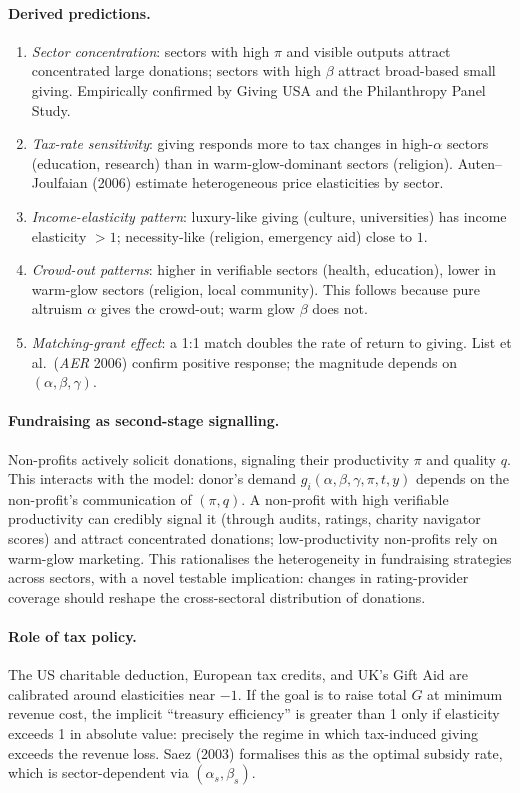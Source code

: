 \documentclass[11pt,a4paper]{article}
\begin{document}
\paragraph{Derived predictions.}
\begin{enumerate}[leftmargin=*,itemsep=1pt]
    \item \emph{Sector concentration}: sectors with high $\pi$ and visible outputs attract concentrated large donations; sectors with high $\beta$ attract broad-based small giving. Empirically confirmed by Giving USA and the Philanthropy Panel Study.
    \item \emph{Tax-rate sensitivity}: giving responds more to tax changes in high-$\alpha$ sectors (education, research) than in warm-glow-dominant sectors (religion). Auten--Joulfaian (2006) estimate heterogeneous price elasticities by sector.
    \item \emph{Income-elasticity pattern}: luxury-like giving (culture, universities) has income elasticity $>1$; necessity-like (religion, emergency aid) close to $1$.
    \item \emph{Crowd-out patterns}: higher in verifiable sectors (health, education), lower in warm-glow sectors (religion, local community). This follows because pure altruism $\alpha$ gives the crowd-out; warm glow $\beta$ does not.
    \item \emph{Matching-grant effect}: a 1:1 match doubles the rate of return to giving. List et al.\ (\emph{AER} 2006) confirm positive response; the magnitude depends on $(\alpha,\beta,\gamma)$.
\end{enumerate}

\paragraph{Fundraising as second-stage signalling.}
Non-profits actively solicit donations, signaling their productivity $\pi$ and quality $q$. This interacts with the model: donor's demand $g_{i}(\alpha,\beta,\gamma,\pi,t,y)$ depends on the non-profit's communication of $(\pi,q)$. A non-profit with high verifiable productivity can credibly signal it (through audits, ratings, charity navigator scores) and attract concentrated donations; low-productivity non-profits rely on warm-glow marketing. This rationalises the heterogeneity in fundraising strategies across sectors, with a novel testable implication: changes in rating-provider coverage should reshape the cross-sectoral distribution of donations.

\paragraph{Role of tax policy.}
The US charitable deduction, European tax credits, and UK's Gift Aid are calibrated around elasticities near $-1$. If the goal is to raise total $G$ at minimum revenue cost, the implicit ``treasury efficiency'' is greater than 1 only if elasticity exceeds 1 in absolute value: precisely the regime in which tax-induced giving exceeds the revenue loss. Saez (2003) formalises this as the optimal subsidy rate, which is sector-dependent via $(\alpha_{s},\beta_{s})$.
\end{document}
